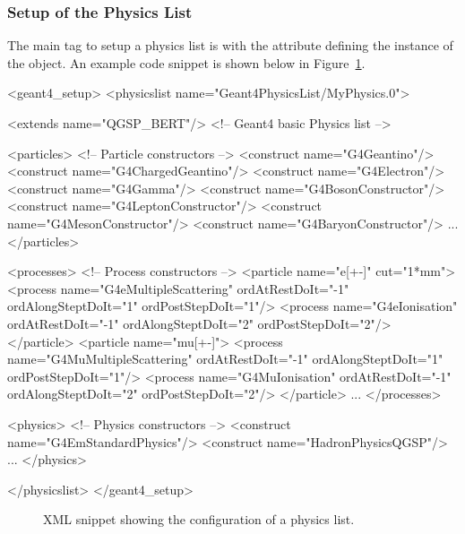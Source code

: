 \documentclass[10pt,a4paper]{article}
\begin{document}
\subsubsection{Setup of the Physics List}
\label{sec:ddg4-setup-xml-physicslist}

\noindent
The main tag to setup a physics list is  with the 
 attribute defining the instance of the  object.
An example code snippet is shown below in Figure~\ref{fig:ddg4-setup-xml-physicslist}.

\begin{code}
<geant4_setup>
  <physicslist name="Geant4PhysicsList/MyPhysics.0">

    <extends name="QGSP_BERT"/>                    <!-- Geant4 basic Physics list -->

    <particles>                                    <!-- Particle constructors     -->
      <construct name="G4Geantino"/>
      <construct name="G4ChargedGeantino"/>
      <construct name="G4Electron"/>
      <construct name="G4Gamma"/>
      <construct name="G4BosonConstructor"/>
      <construct name="G4LeptonConstructor"/>
      <construct name="G4MesonConstructor"/>
      <construct name="G4BaryonConstructor"/>
      ...
    </particles>

    <processes>                                    <!-- Process constructors      -->
      <particle name="e[+-]" cut="1*mm">
        <process name="G4eMultipleScattering"  ordAtRestDoIt="-1"       ordAlongSteptDoIt="1"
                                               ordPostStepDoIt="1"/>
        <process name="G4eIonisation"          ordAtRestDoIt="-1"       ordAlongSteptDoIt="2"
                                               ordPostStepDoIt="2"/>
      </particle>
      <particle name="mu[+-]">
        <process name="G4MuMultipleScattering" ordAtRestDoIt="-1"       ordAlongSteptDoIt="1"     
                                               ordPostStepDoIt="1"/>
        <process name="G4MuIonisation"         ordAtRestDoIt="-1"       ordAlongSteptDoIt="2"
                                               ordPostStepDoIt="2"/>
      </particle>
      ...
    </processes>

    <physics>                                      <!-- Physics constructors      -->
      <construct name="G4EmStandardPhysics"/>
      <construct name="HadronPhysicsQGSP"/>
      ...
    </physics>
    
  </physicslist>
</geant4_setup>
\end{code}
\begin{figure}[h]
\caption{XML snippet showing the configuration of a physics list.}
\label{fig:ddg4-setup-xml-physicslist}
\end{figure}
\end{document}

